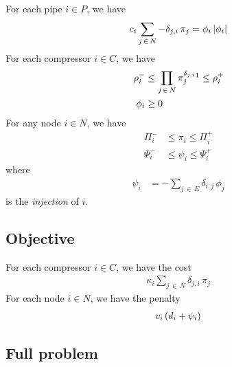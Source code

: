 \documentclass[a4paper, 12pt]{article}
\begin{document}
For each pipe $i \in P$, we have
\begin{align} \label{eq:flow}
    c_i \sum_{j \, \in \, N} -\delta_{j, i} \, \pi_j = \phi_i \left|\phi_i\right|
\end{align}
For each compressor $i \in C$, we have
\begin{align}
    \rho^-_i & \leq \prod_{j \, \in \, N} \pi_j^{\delta_{j, i}} \footnotemark \leq \rho^+_i \\
    \phi_i & \geq 0
\end{align} 
For any node $i \in N$, we have
\begin{align}
   \Pi^-_i & \leq \pi_i \leq \Pi^+_i \\
   \Psi_i^- & \leq \psi_i \leq \Psi_i^+
\end{align}
where
\begin{align}
    \psi_i & = -\sum_{j \, \in \, E} \delta_{i, j} \, \phi_j
    \label{eq:balance}
\end{align}
is the \emph{injection} of $i$.

\subsection{Objective}

For each compressor $i \in C$, we have the cost
\begin{align}
   \kappa_i \sum_{j \, \in \, N} \delta_{j, i} \, \pi_j
\end{align}
For each node $i \in N$, we have the penalty
\begin{align}
   v_i \left(d_i + \psi_i\right)
\end{align}

\subsection{Full problem}
\end{document}
